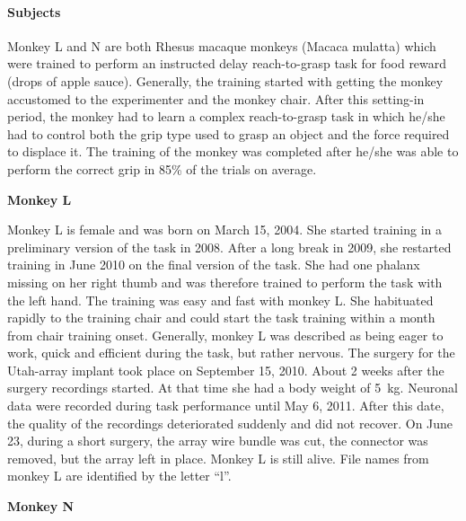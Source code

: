 {\paragraph{Subjects}

 Monkey L and N are both Rhesus macaque monkeys (Macaca mulatta) which were trained to perform an instructed delay reach-to-grasp task for food reward (drops of apple sauce). Generally, the training started with getting the monkey accustomed to the experimenter and the monkey chair. After this setting-in period, the monkey had to learn a complex reach-to-grasp task in which he/she had to control both the grip type used to grasp an object and the force required to displace it. The training of the monkey was completed after he/she was able to perform the correct grip in 85\% of the trials on average.

\textbf{Monkey L} 

Monkey L is female and was born on March 15, 2004. She started training in a preliminary version of the task in 2008. After a long break in 2009, she restarted training in June 2010 on the final version of the task. She had one phalanx missing on her right thumb and was therefore trained to perform the task with the left hand. The training was easy and fast with monkey L. She habituated rapidly to the training chair and could start the task training within a month from chair training onset. Generally, monkey L was described as being eager to work, quick and efficient during the task, but rather nervous. The surgery for the Utah-array implant took place on September 15, 2010. About 2 weeks after the surgery recordings started. At that time she had a body weight of 5 kg. Neuronal data were recorded during task performance until May 6, 2011. After this date, the quality of the recordings deteriorated suddenly and did not recover. On June 23, during a short surgery, the array wire bundle was cut, the connector was removed, but the array left in place. Monkey L is still alive. File names from monkey L are identified by the letter “l”.

\textbf{Monkey N} 

}

